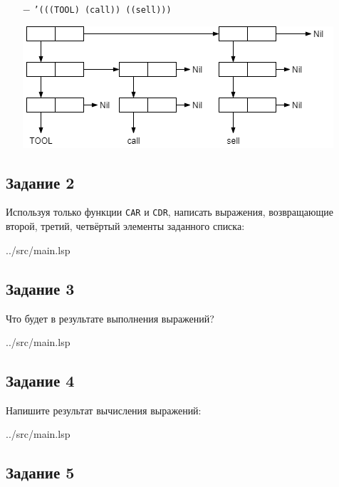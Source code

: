 \begin{enumerate}[topsep=0pt]
	\item[$-$] {\texttt{'(((TOOL) (call)) ((sell)))}}

	\includegraphics[scale=0.8]{img/1.6}
\end{enumerate}

\subsection*{Задание 2}

Используя только функции {\texttt{CAR}} и {\texttt{CDR}}, написать выражения, возвращающие второй, третий, четвёртый элементы заданного списка:

\begin{lstinputlisting}[
	label={lst:t1},
	style={lsp},
	linerange={3-10},
	]{../src/main.lsp}
\end{lstinputlisting}

\subsection*{Задание 3}

Что будет в результате выполнения выражений?

\begin{lstinputlisting}[
	label={lst:t2},
	style={lsp},
	linerange={14-17},
	]{../src/main.lsp}
\end{lstinputlisting}

\subsection*{Задание 4}

Напишите результат вычисления выражений:

\begin{lstinputlisting}[
	label={lst:t3},
	style={lsp},
	linerange={19-35},
	]{../src/main.lsp}
\end{lstinputlisting}

\subsection*{Задание 5}

